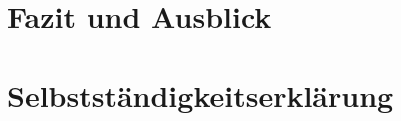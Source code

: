\documentclass[a4paper, ngerman, 12pt]{scrreprt}
\begin{document}
\chapter{Fazit und Ausblick}

%

\printbibliography



\chapter{Selbstständigkeitserklärung}

\end{document}

